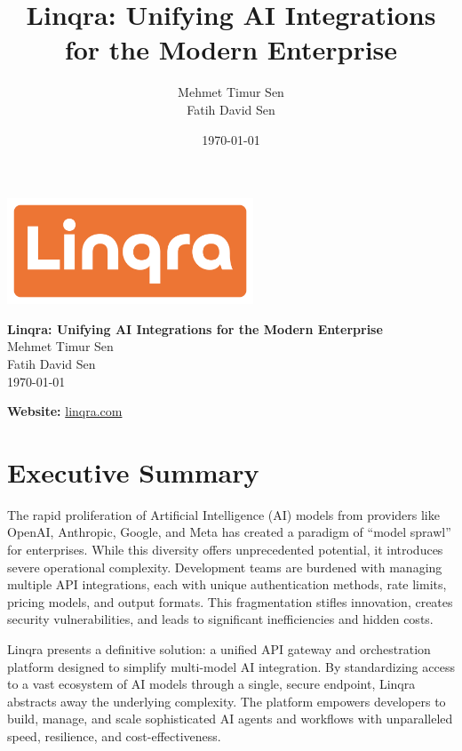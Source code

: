 \documentclass[11pt,a4paper]{article}
\title{\textbf{Linqra: Unifying AI Integrations for the Modern Enterprise}}\author{Mehmet Timur Sen \\ Fatih David Sen}\date{\today}
\begin{document}
\begin{center}
\vspace*{2.5cm}
\includegraphics[width=0.55\textwidth]{linqra_logo}
\vspace{1.8cm}

{\Huge \textbf{Linqra: Unifying AI Integrations for the Modern Enterprise}}\\[16pt]
\vspace{1.8cm}
{\LARGE Mehmet Timur Sen}\\[6pt]
\vspace{0.2cm}
{\LARGE Fatih David Sen}\\[12pt]
{\large \today}
\end{center}

\vfill

\begin{center}
\textbf{Website:} \href{https://linqra.com}{linqra.com}
\end{center}

\newpage
\tableofcontents
\newpage

\newpage
\section{Executive Summary}
The rapid proliferation of Artificial Intelligence (AI) models from providers like OpenAI, Anthropic, Google, and Meta has created a paradigm of ``model sprawl'' for enterprises. While this diversity offers unprecedented potential, it introduces severe operational complexity. Development teams are burdened with managing multiple API integrations, each with unique authentication methods, rate limits, pricing models, and output formats. This fragmentation stifles innovation, creates security vulnerabilities, and leads to significant inefficiencies and hidden costs.

Linqra presents a definitive solution: a unified API gateway and orchestration platform designed to simplify multi-model AI integration. By standardizing access to a vast ecosystem of AI models through a single, secure endpoint, Linqra abstracts away the underlying complexity. The platform empowers developers to build, manage, and scale sophisticated AI agents and workflows with unparalleled speed, resilience, and cost-effectiveness.
\end{document}
